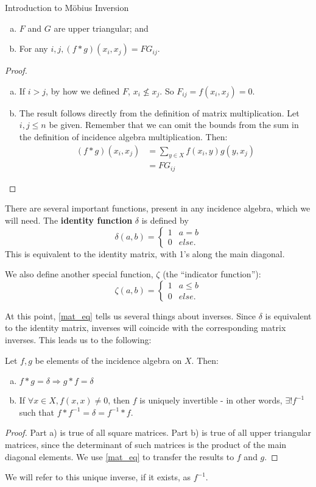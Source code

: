 \documentclass[12pt]{pom_thesis}
\begin{document}
\begin{chapter}{Introduction to M\"obius Inversion}
\begin{lemma}
\begin{enumerate}[a)]
\item $F$ and $G$ are upper triangular; and
\item For any $i,j, (f * g)(x_i, x_j)=FG_{ij}$.
\end{enumerate}
\end{lemma}
\begin{proof}
\begin{enumerate}[a)]
\item If $i>j$, by how we defined $F$, $x_i \nleq x_j$. So $F_{ij} = f(x_i, x_j) = 0$. 
\item
The result follows directly from the definition of matrix multiplication. Let $i,j\leq n$ be given. Remember that we can omit the bounds from the sum in the definition of incidence algebra multiplication. Then:
\begin{align*}
(f * g)(x_i, x_j) &= \sum_{y \in X} f(x_i,y)g(y,x_j)\\
&=FG_{ij}
\end{align*}
\end{enumerate}
\end{proof}


There are several important functions, present in any incidence algebra, which we will need. 
The \textbf{identity function} $\delta$ is defined by 
\[\delta(a,b) = \begin{cases} 1 & a = b \\ 0 & else. \end{cases}
\]
This is equivalent to the identity matrix, with 1's along the main diagonal.

We also define another special function, $\zeta$ (the ``indicator function''):
\[
\zeta(a,b) = \begin{cases} 1 & a \leq b \\ 0 & else. \end{cases}
\]

At this point, \ref{mat_eq} tells us several things about inverses. Since $\delta$ is equivalent to the identity matrix, inverses will coincide with the corresponding matrix inverses. This leads us to the following:
\begin{cor}\label{cor_inv}
Let $f,g$ be elements of the incidence algebra on $X$. Then:
\begin{enumerate}[a)]
\item $f*g = \delta \Rightarrow g*f = \delta$
\item If $\forall x \in X, f(x,x) \neq 0$, then $f$ is uniquely invertible - in other words, $\exists! f^{-1}$ such that $f*f^{-1} = \delta = f^{-1} * f$.
\end{enumerate}
\end{cor}
\begin{proof}
Part a) is true of all square matrices. Part b) is true of all upper triangular matrices, since the determinant of such matrices is the product of the main diagonal elements. We use \ref{mat_eq} to transfer the results to $f$ and $g$.
\end{proof}
We will refer to this unique inverse, if it exists, as $f^{-1}$. 


\end{chapter}
\end{document}
